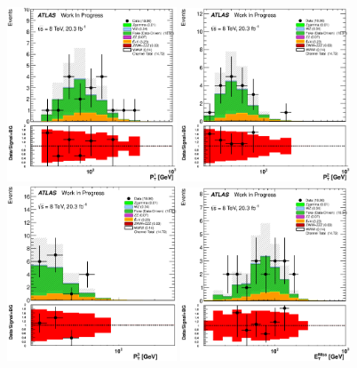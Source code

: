 \begin{figure}[h!]
\centering
\includegraphics[width=0.45\textwidth]{figures/Fake_CR/LeadingLeptonPt_histratio.eps}
\includegraphics[width=0.45\textwidth]{figures/Fake_CR/SubleadingLeptonPt_histratio.eps}
\includegraphics[width=0.45\textwidth]{figures/Fake_CR/MinimumLeptonPt_histratio.eps}
\includegraphics[width=0.45\textwidth]{figures/Fake_CR/MET_Et_histratio.eps}

\end{figure}
